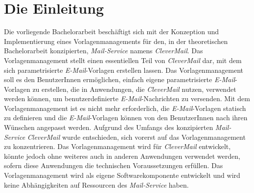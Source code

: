 \chapter{Die Einleitung}
\label{cha:Einleitung}
Die vorliegende Bachelorarbeit beschäftigt sich mit der Konzeption und Implementierung eines Vorlagenmanagements für den, in der theoretischen Bachelorarbeit konzipierten, \emph{Mail-Service} namens \emph{CleverMail}. Das Vorlagenmanagement stellt einen essentiellen Teil von \emph{CleverMail} dar, mit dem sich parametrisierte \emph{E-Mail}-Vorlagen erstellen lassen. Das Vorlagenmanagement soll es den BenutzerInnen ermöglichen, einfach eigene parametrisierte \emph{E-Mail}-Vorlagen zu erstellen, die in Anwendungen, die \emph{CleverMail} nutzen, verwendet werden können, um benutzerdefinierte \emph{E-Mail}-Nachrichten zu versenden. Mit dem Vorlagenmanagement ist es nicht mehr erforderlich, die \emph{E-Mail}-Vorlagen statisch zu definieren und die \emph{E-Mail}-Vorlagen können von den BenutzerInnen nach ihren Wünschen angepasst werden.
\newline
\newline
Aufgrund des Umfangs des konzipierten \emph{Mail-Service} \emph{CleverMail} wurde entschieden,  sich vorerst auf das Vorlagenmanagement zu konzentrieren. Das Vorlagenmanagement wird für \emph{CleverMail} entwickelt, könnte jedoch ohne weiteres auch in anderen Anwendungen verwendet werden, sofern diese Anwendungen die technischen Voraussetzungen erfüllen. Das Vorlagenmanagement wird als eigene Softwarekomponente entwickelt und wird keine Abhängigkeiten auf Ressourcen des \emph{Mail-Service} haben.

